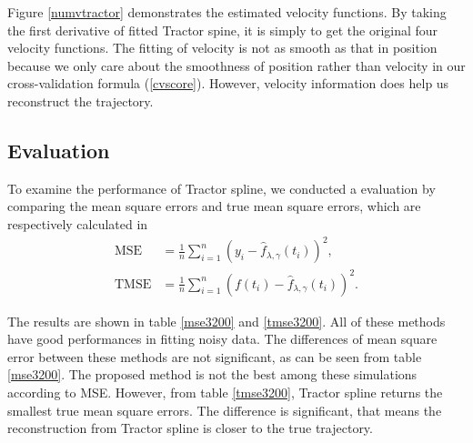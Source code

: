Figure \ref{numvtractor} demonstrates the estimated velocity functions. By taking the first derivative of fitted Tractor spine, it is simply to get the original four velocity functions. The fitting of velocity is not as smooth as that in position because we only care about the smoothness of position rather than velocity in our cross-validation formula (\ref{cvscore}). However, velocity information does help us reconstruct the trajectory.



\subsection{Evaluation}
To examine the performance of Tractor spline, we conducted a evaluation by comparing the mean square errors and true mean square errors, which are respectively calculated in
\begin{align}
\mbox{MSE}&= \frac{1}{n} \sum_{i=1}^{n} \left( y_i-\hat{f}_{\lambda,\gamma}(t_i) \right)^2,\\
\mbox{TMSE}&= \frac{1}{n} \sum_{i=1}^{n} \left( f(t_i)-\hat{f}_{\lambda,\gamma}(t_i) \right)^2.
\end{align}



The results are shown in table \ref{mse3200} and \ref{tmse3200}. All of these methods have good performances in fitting noisy data. The differences of mean square error between these methods are not significant, as can be seen from table \ref{mse3200}. The proposed method is not the best among these simulations according to MSE. However, from table \ref{tmse3200}, Tractor spline returns the smallest true mean square errors. The difference is significant, that means the reconstruction from Tractor spline is closer to the true trajectory. 
 
